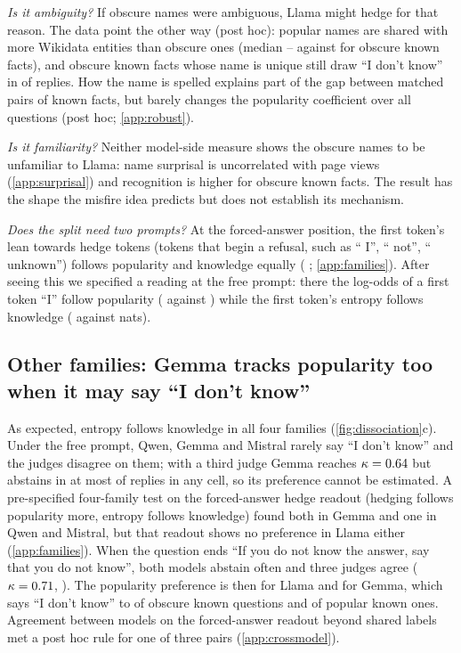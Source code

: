 \documentclass{article}
\newcommand{\idk}{``I don't know''}
\begin{document}
\emph{Is it ambiguity?} If obscure names were ambiguous, Llama might hedge for that reason. The data point the other way (post hoc): popular names are shared with more Wikidata entities than obscure ones (median \amPopKnownHom--\amPopUnkHom{} against \amObsKnownHom{} for obscure known facts), and obscure known facts whose name is unique still draw \idk{} in \amSingle{} of replies. How the name is spelled explains part of the gap between matched pairs of known facts, but barely changes the popularity coefficient over all questions (post hoc; \cref{app:robust}).

\emph{Is it familiarity?} Neither model-side measure shows the obscure names to be unfamiliar to Llama: name surprisal is uncorrelated with page views (\cref{app:surprisal}) and recognition is higher for obscure known facts. The result has the shape the misfire idea predicts but does not establish its mechanism.

\emph{Does the split need two prompts?} At the forced-answer position, the first token's lean towards hedge tokens (tokens that begin a refusal, such as `` I'', `` not'', `` unknown'') follows popularity and knowledge equally (\loLlamaDiff{} \loLlamaDiffCI; \cref{app:families}). After seeing this we specified a reading at the free prompt: there the log-odds of a first token ``I'' follow popularity (\eoFreeIPop{} against \eoFreeIKnow) while the first token's entropy follows knowledge (\eoFreeEntKnow{} against \eoFreeEntPop{} nats).

\subsection{Other families: Gemma tracks popularity too when it may say \idk}
\label{sec:families}

As expected, entropy follows knowledge in all four families (\cref{fig:dissociation}c). Under the free prompt, Qwen, Gemma and Mistral rarely say \idk{} and the judges disagree on them; with a third judge Gemma reaches $\kappa=0.64$ but abstains in at most \tjGemmaObsUnk{} of replies in any cell, so its preference cannot be estimated. A pre-specified four-family test on the forced-answer hedge readout (hedging follows popularity more, entropy follows knowledge) found both in Gemma and one in Qwen and Mistral, but that readout shows no preference in Llama either (\cref{app:families}). When the question ends ``If you do not know the answer, say that you do not know'', both models abstain often and three judges agree ($\kappa=0.71$, \pmGemmaKappa). The popularity preference is then \pmLlamaDiff{} \pmLlamaDiffCI{} for Llama and \pmGemmaDiff{} \pmGemmaDiffCI{} for Gemma, which says \idk{} to \pmGemmaObsKnown{} of obscure known questions and \pmGemmaPopKnown{} of popular known ones. Agreement between models on the forced-answer readout beyond shared labels met a post hoc rule for one of three pairs (\cref{app:crossmodel}).
\end{document}
